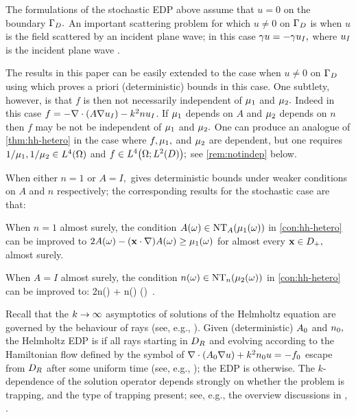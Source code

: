 \label{rem:planewave}
The formulations of the stochastic EDP above assume that $u=0$ on the boundary $\Gamma_{D}.$ An important scattering problem for which $u \neq 0$ on $\Gamma_{D}$ is when $u$ is the field scattered by an incident plane wave; in this case $\gamma u = -\gamma u_{I},$ where $u_{I}$ is the incident plane wave \cite[p. 107]{ChGrLaSp:12}.

The results in this paper can be easily extended to the case when $u\neq0$ on $\Gamma_{D}$ using \cite[Theorem 2.19(ii)]{GrPeSp:19}  which proves a priori (deterministic) bounds in this case. One subtlety, however, is that $f$ is then not necessarily independent of $\mu_{1}$ and $\mu_{2}.$ Indeed in this case
$f = -\grad\cdot\mleft(A\grad \uI\mright) - k^2n\uI$.
If $\mu_{1}$ depends on $A$ and $\mu_{2}$ depends on $n$ then %
$f$ may be not be independent of $\mu_{1}$ and $\mu_{2}.$ One can produce an analogue of \cref{thm:hh-hetero} in the case where $f,\mu_{1},$ and $\mu_{2}$ are dependent, but one requires $1/\muo, 1/\mut \in \LfO$ and $f \in \LfOLtD;$ see \cref{rem:notindep} below.
\ere

\bre[The case when either $n=1$ or $A=I$]\label{rem:ones}
When either $n=1$ or $A=I,$ \cite[Theorem 2.19]{GrPeSp:19} gives deterministic bounds under weaker conditions on $A$ and $n$ respectively; the corresponding results for the stochastic case are that:

\bit
\item 

When $n=1$  almost surely, the condition $A(\omega) \in \NTA{\muo(\omega)}$ in \cref{con:hh-hetero} can be improved to
$2A(\omega) - \mleft(\bx \cdot \nabla \mright)A(\omega) \geq \muo(\omega)$
for almost every $\mathbf{x}\in D_{+},$ almost surely.

\item When $A=I$ almost surely, the condition $n(\omega) \in \NTn{\mut(\omega)}$ in \cref{con:hh-hetero} can be improved to:
\beq\label{eq:nimproved}
2n(\omega) + \bx \cdot \nabla n(\omega) \geq \mut(\omega) \,.
\eeq
\eit
\ere

Recall that the $k\rightarrow \infty$ asymptotics of solutions of the Helmholtz
equation are governed by the behaviour of rays (see, e.g.,
\cite{BaBu:91}). Given (deterministic) $A_{0}$ and $n_{0},$ the Helmholtz EDP is  if all rays starting
in $D_{R}$ and evolving according to the
Hamiltonian flow defined by the symbol of $\grad\cdot\mleft(\Az\grad u\mright) + k^2\nz u = -\fz$  escape from $D_{R}$ after some uniform time (see, e.g., \cite[Definition 1.1]{Bu:02}); the EDP is  otherwise.
The $k$-dependence of the solution operator depends strongly on
whether the problem is trapping, and the type of trapping present;
see, e.g., the overview discussions in \cite[Section 1]{GrPeSp:19},
\cite[Section 1.1]{ChSpGiSm:17}.

